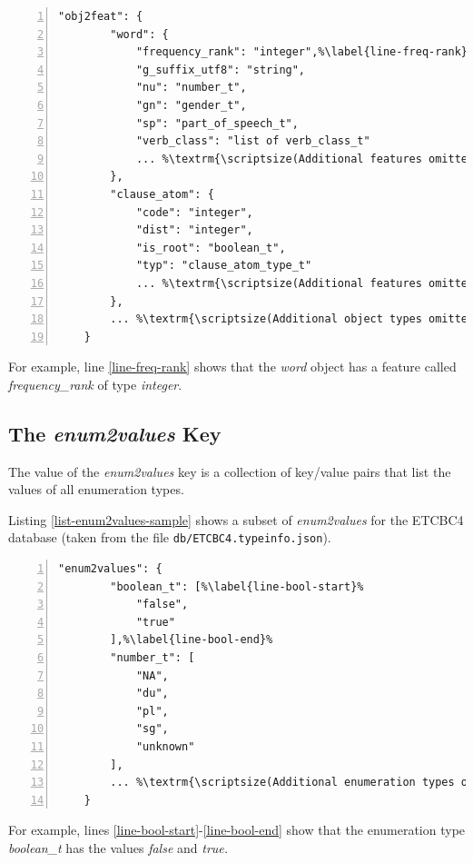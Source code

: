 \documentclass[11pt,oneside,a4paper]{memoir}
\begin{document}
\begin{lstlisting}[numbers=left,caption=A sample obj2feat value,label=list-obj2feat-sample]
    "obj2feat": {
        "word": {
            "frequency_rank": "integer",%\label{line-freq-rank}%
            "g_suffix_utf8": "string",
            "nu": "number_t",
            "gn": "gender_t",
            "sp": "part_of_speech_t",
            "verb_class": "list of verb_class_t"
            ... %\textrm{\scriptsize(Additional features omitted)}%
        },
        "clause_atom": {
            "code": "integer",
            "dist": "integer",
            "is_root": "boolean_t",
            "typ": "clause_atom_type_t"
            ... %\textrm{\scriptsize(Additional features omitted)}%
        },
        ... %\textrm{\scriptsize(Additional object types omitted)}%
    }
\end{lstlisting}

For example, line \ref{line-freq-rank} shows that the \emph{word} object has a feature called
\emph{frequency\_rank} of type \emph{integer}.

\subsection{The \emph{enum2values} Key}\label{enum2values}

The value of the \emph{enum2values} key is a collection of key/value pairs that list the values of
all enumeration types.

Listing \ref{list-enum2values-sample} shows a subset of \emph{enum2values} for the ETCBC4 database
(taken from the file \texttt{db/ETCBC4.typeinfo.json}).

\begin{lstlisting}[numbers=left,caption=A sample enum2values value,label=list-enum2values-sample]
    "enum2values": {
        "boolean_t": [%\label{line-bool-start}%
            "false",
            "true"
        ],%\label{line-bool-end}%
        "number_t": [
            "NA",
            "du",
            "pl",
            "sg",
            "unknown"
        ],
        ... %\textrm{\scriptsize(Additional enumeration types omitted)}%
    }
\end{lstlisting}

For example, lines \ref{line-bool-start}-\ref{line-bool-end} show that the enumeration type
\emph{boolean\_t} has the values \emph{false} and \emph{true.}

\end{document}
